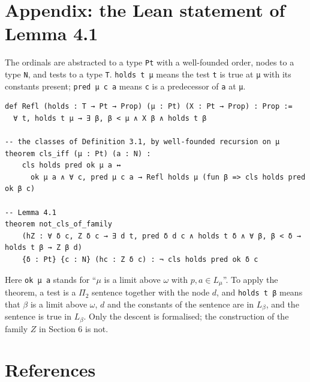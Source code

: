 \documentclass[11pt]{article}
\begin{document}
\section*{Appendix: the Lean statement of Lemma 4.1}

The ordinals are abstracted to a type \texttt{Pt} with a well-founded order, nodes to a type \texttt{N}, and tests to a
type \texttt{T}.
\texttt{holds t μ} means the test \texttt{t} is true at \texttt{μ} with its constants present; \texttt{pred μ c a}
means \texttt{c} is a predecessor of \texttt{a} at \texttt{μ}.

\begin{verbatim}
def Refl (holds : T → Pt → Prop) (μ : Pt) (X : Pt → Prop) : Prop :=
  ∀ t, holds t μ → ∃ β, β < μ ∧ X β ∧ holds t β

-- the classes of Definition 3.1, by well-founded recursion on μ
theorem cls_iff (μ : Pt) (a : N) :
    cls holds pred ok μ a ↔
      ok μ a ∧ ∀ c, pred μ c a → Refl holds μ (fun β => cls holds pred ok β c)

-- Lemma 4.1
theorem not_cls_of_family
    (hZ : ∀ δ c, Z δ c → ∃ d t, pred δ d c ∧ holds t δ ∧ ∀ β, β < δ → holds t β → Z β d)
    {δ : Pt} {c : N} (hc : Z δ c) : ¬ cls holds pred ok δ c
\end{verbatim}

Here \texttt{ok μ a} stands for ``$\mu$ is a limit above $\omega$ with $p, a \in L_{\mu}$''. To apply the theorem, a
test is a $\Pi_2$ sentence together with the node $d$, and \texttt{holds t β} means that $\beta$ is a limit above
$\omega$, $d$ and the constants of the sentence are in $L_{\beta}$, and the sentence is true in $L_{\beta}$. Only the descent is formalised; the
construction of the family $Z$ in Section 6 is not.

\section*{References}
\end{document}
